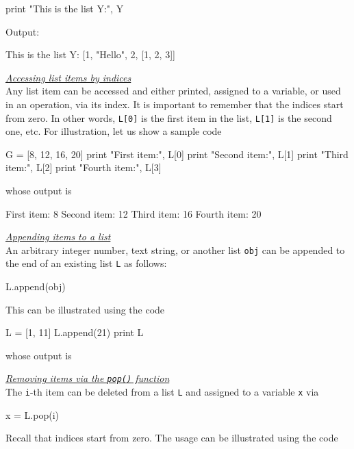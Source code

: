 \begin{bluecode}
print "This is the list Y:", Y
\end{bluecode}
Output:

\begin{bluecode}
This is the list Y: [1, "Hello", 2, [1, 2, 3]]
\end{bluecode}
\underline{\em Accessing list items by indices}\\

Any list item can be accessed and either printed, assigned 
to a variable, or used in an operation, via its index. It is important to remember that 
the indices start from zero. In other words, {\tt L[0]} is the 
first item in the list, {\tt L[1]} is the second one, etc. For
illustration, let us show a sample code

\begin{bluecode}
G = [8, 12, 16, 20]
print "First item:", L[0]
print "Second item:", L[1]
print "Third item:", L[2]
print "Fourth item:", L[3]
\end{bluecode}
whose output is

\begin{bluecode}
First item: 8
Second item: 12
Third item: 16
Fourth item: 20
\end{bluecode}
\underline{\em Appending items to a list}\\

An arbitrary integer number, text string, or another list {\tt obj} can be appended 
to the end of an existing list {\tt L} as follows:

\begin{bluecode}
L.append(obj)
\end{bluecode}
This can be illustrated using the code

\begin{bluecode}
L = [1, 11]
L.append(21)
print L
\end{bluecode}
whose output is 

\begin{bluecode}
[1, 11, 21]
\end{bluecode}
\underline{\em Removing items via the {\tt pop()} function}\\

The {\tt i}-th item can be deleted from a list {\tt L} 
and assigned to a variable {\tt x} via 

\begin{bluecode}
x = L.pop(i)
\end{bluecode}
Recall that indices start from zero. The usage can be illustrated using the code

